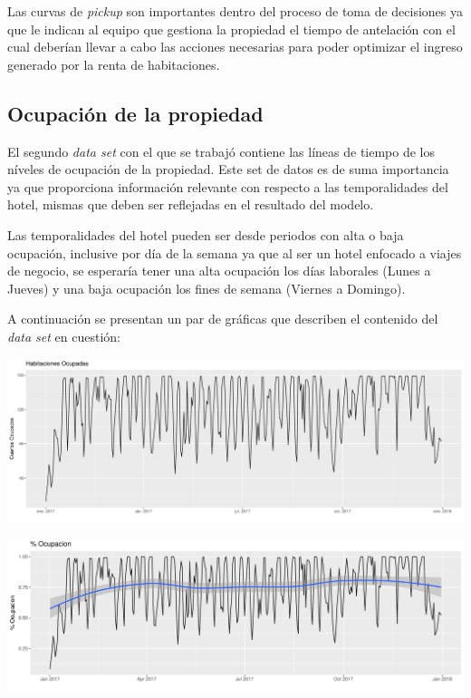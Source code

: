 Las curvas de \emph{pickup} son importantes dentro del proceso de toma de decisiones ya que le indican al equipo que gestiona la propiedad el tiempo de antelación con el cual deberían llevar a cabo las acciones necesarias para poder optimizar el ingreso generado por la renta de habitaciones.

\subsection*{Ocupación de la propiedad}

El segundo \emph{data set} con el que se trabajó contiene las líneas de tiempo de los níveles de ocupación de la propiedad. Este set de datos es de suma importancia ya que proporciona información relevante con respecto a las temporalidades del hotel, mismas que deben ser reflejadas en el resultado del modelo.

Las temporalidades del hotel pueden ser desde periodos con alta o baja ocupación, inclusive por día de la semana ya que al ser un hotel enfocado a viajes de negocio, se esperaría tener una alta ocupación los días laborales (Lunes a Jueves) y una baja ocupación los fines de semana (Viernes a Domingo).

A continuación se presentan un par de gráficas que describen el contenido del \emph{data set} en cuestión:

\color{fgcolor}
\includegraphics[width=\maxwidth]{figures/HabitacionesOcupadas-1} 

\color{fgcolor}
\includegraphics[width=\maxwidth]{Figures/Ocupacion-1} 

